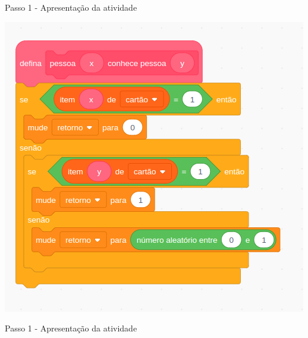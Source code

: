 \documentclass{beamer}
\begin{document}
\begin{frame}{Passo 1 - Apresentação da atividade}




\begin{center}
	\includegraphics[scale=0.45]{images/perguntas.png} 
\end{center}

    


 

\end{frame}


\begin{frame}{Passo 1 - Apresentação da atividade}


 
    





\end{frame}
\end{document}

